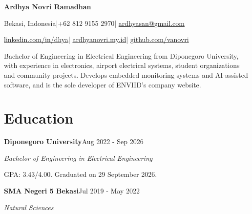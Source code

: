 \documentclass[11pt,a4paper]{article}
\newcommand{\cventry}[6]{%
  \Needspace{4\baselineskip}%
  \textbf{#3}\hfill #1\par
  \textit{#2}\ifstrempty{#4}{}{\hfill #4}\par
  #6\par\vspace{4pt}}
\begin{document}
\begin{center}
{\fontsize{19}{22}\selectfont\bfseries Ardhya Novri Ramadhan}\par
\vspace{3pt}
{\small Bekasi, Indonesia\enspace |\enspace +62 812 9155 2970\enspace |\enspace
\href{mailto:ardhyasan@gmail.com}{ardhyasan@gmail.com}}\par
{\small \href{https://www.linkedin.com/in/dhya/}{linkedin.com/in/dhya}\enspace |\enspace
\href{https://ardhyanovri.my.id}{ardhyanovri.my.id}\enspace |\enspace
\href{https://github.com/vanovri}{github.com/vanovri}}
\end{center}
\raggedright

Bachelor of Engineering in Electrical Engineering from Diponegoro University, with experience
in electronics, airport electrical systems, student organizations and community projects. Develops embedded monitoring systems and
AI-assisted software, and is the sole developer of ENVIID's company website.

\section{Education}
\cventry{Aug 2022 - Sep 2026}{Bachelor of Engineering in Electrical Engineering}{Diponegoro University}{}{}{
GPA: 3.43/4.00. Graduated on 29 September 2026.}
\cventry{Jul 2019 - May 2022}{Natural Sciences}{SMA Negeri 5 Bekasi}{}{}{}
\end{document}
